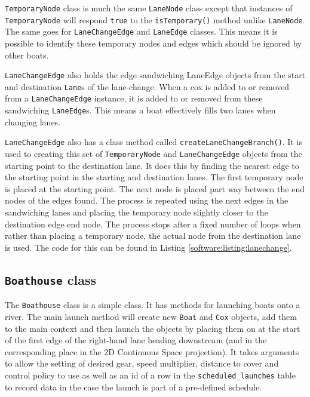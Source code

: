 \texttt{TemporaryNode} class is much the same \texttt{LaneNode} class except that
instances of \texttt{TemporaryNode} will respond \texttt{true} to the
\texttt{isTemporary()} method unlike
\texttt{LaneNode}. The same goes for \texttt{LaneChangeEdge} and \texttt{LaneEdge} classes. This
means it is possible to identify these temporary nodes and edges which
should be ignored by other boats.

\texttt{LaneChangeEdge} also holds the edge sandwiching LaneEdge objects from
the start and destination \texttt{Lane}s of the lane-change. When a cox is
added to or removed from a \texttt{LaneChangeEdge} instance, it is added to or removed
from these sandwiching \texttt{LaneEdge}s. This means a boat effectively fills
two lanes when changing lanes.

\texttt{LaneChangeEdge} also has a class method called \texttt{createLaneChangeBranch()}. It is used to creating this
set of \texttt{TemporaryNode} and \texttt{LaneChangeEdge} objects from the starting
point to the destination lane. It does this by finding the nearest
edge to the starting point in the starting and destination lanes. The
first temporary node is placed at the starting point. The next node is
placed part way between the end nodes of the edges found. The process
is repeated using the next edges in the sandwiching lanes and placing
the temporary node slightly closer to the destination edge end
node. The process stops after a fixed number of loops when rather than
placing a temporary node, the actual node from the destination lane is
used. The code for this can be found in Listing \ref{software:listing:lanechange}.



\subsection{\texttt{Boathouse} class}
The \texttt{Boathouse} class is a simple class. It has methods for launching
boats onto a river. The main launch method will create new \texttt{Boat} and
\texttt{Cox} objects, add them to the main context and then launch the objects
by placing them on at the start of the first edge of the right-hand lane heading downstream (and in the corresponding place in the 2D Continuous Space projection). It takes arguments to
allow the setting of desired gear, speed multiplier, distance to
cover and control policy to use as well as an id of a row in the
\texttt{scheduled\_launches} table to record data in the case the launch is part of a pre-defined schedule.

